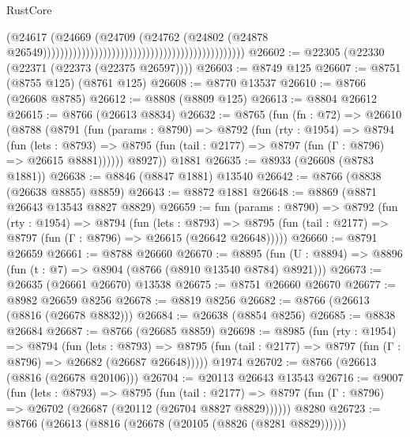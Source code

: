 \begin{lexlean}{RustCore}
\begin{coremodule}
                                                                                      (@24617
                                                                                        (@24669
                                                                                          (@24709
                                                                                            (@24762
                                                                                              (@24802
                                                                                                (@24878
                                                                                                  @26549)))))))))))))))))))))))))))))))))))))))))))))))
@26602 := @22305 (@22330 (@22371 (@22373 (@22375 @26597))))
@26603 := @8749 @125
@26607 := @8751 (@8755 @125) (@8761 @125)
@26608 := @8770 @13537
@26610 := @8766 (@26608 @8785)
@26612 := @8808 (@8809 @125)
@26613 := @8804 @26612
@26615 := @8766 (@26613 @8834)
@26632 := @8765
    (fun (fn : @72) =>
    @26610
      (@8788
        (@8791
          (fun (params : @8790) =>
          @8792
            (fun (rty : @1954) =>
            @8794
              (fun (lets : @8793) =>
              @8795 (fun (tail : @2177) => @8797 (fun (Γ : @8796) => @26615 @8881))))))
        @8927))
    @1881
@26635 := @8933 (@26608 (@8783 @1881))
@26638 := @8846 (@8847 @1881) @13540
@26642 := @8766 (@8838 (@26638 @8855) @8859)
@26643 := @8872 @1881
@26648 := @8869 (@8871 @26643 @13543 @8827 @8829)
@26659 := fun (params : @8790) =>
  @8792
    (fun (rty : @1954) =>
    @8794
      (fun (lets : @8793) =>
      @8795 (fun (tail : @2177) => @8797 (fun (Γ : @8796) => @26615 (@26642 @26648)))))
@26660 := @8791 @26659
@26661 := @8788 @26660
@26670 := @8895
    (fun (U : @8894) => @8896 (fun (t : @7) => @8904 (@8766 (@8910 @13540 @8784) @8921)))
@26673 := @26635 (@26661 @26670) @13538
@26675 := @8751 @26660 @26670
@26677 := @8982 @26659 @8256
@26678 := @8819 @8256
@26682 := @8766 (@26613 (@8816 (@26678 @8832)))
@26684 := @26638 (@8854 @8256)
@26685 := @8838 @26684
@26687 := @8766 (@26685 @8859)
@26698 := @8985
    (fun (rty : @1954) =>
    @8794
      (fun (lets : @8793) =>
      @8795 (fun (tail : @2177) => @8797 (fun (Γ : @8796) => @26682 (@26687 @26648)))))
    @1974
@26702 := @8766 (@26613 (@8816 (@26678 @20106)))
@26704 := @20113 @26643 @13543
@26716 := @9007
    (fun (lets : @8793) =>
    @8795
      (fun (tail : @2177) =>
      @8797 (fun (Γ : @8796) => @26702 (@26687 (@20112 (@26704 @8827 @8829))))))
    @8280
@26723 := @8766 (@26613 (@8816 (@26678 (@20105 (@8826 (@8281 @8829))))))

\end{coremodule}
\end{lexlean}
